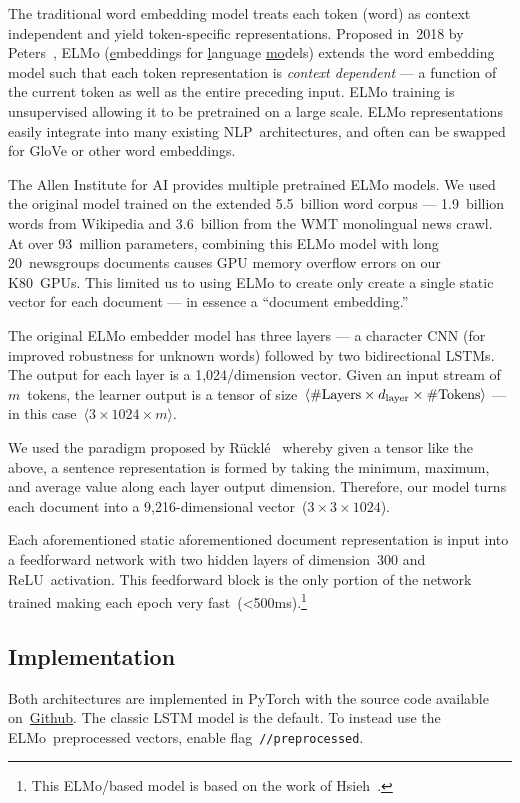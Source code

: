 The traditional word embedding model treats each token (word) as context independent and yield token-specific representations. Proposed in~2018 by Peters\etal~\cite{Peters:2018}, ELMo (\underline{e}mbeddings for \underline{l}anguage \underline{mo}dels) extends the word embedding model such that each token representation is \textit{context dependent} --- a function of the current token as well as the entire preceding input.  ELMo training is unsupervised allowing it to be pretrained on a large scale.  ELMo representations easily integrate into many existing NLP~architectures, and often can be swapped for GloVe or other word embeddings.

The Allen Institute for AI provides multiple pretrained ELMo models.  We used the original model trained on the extended 5.5~billion word corpus --- 1.9~billion words from Wikipedia and 3.6~billion from the WMT monolingual news crawl. At over 93~million parameters, combining this ELMo model with long 20~newsgroups documents causes GPU memory overflow errors on our K80~GPUs.  This limited us to using ELMo to create only create a single static vector for each document --- in essence a ``document embedding.''

The original ELMo embedder model has three layers --- a character CNN (for improved robustness for unknown words) followed by two bidirectional LSTMs.  The output for each layer is a 1,024\-/dimension vector.  Given an input stream of $m$~tokens, the learner output is a tensor of size~${\langle \textnormal{\#Layers} \times d_{\textnormal{layer}} \times \textnormal{\#Tokens} \rangle}$ --- in this case~${\langle 3 \times 1024 \times m \rangle}$.

We used the paradigm proposed by R\"{u}ckl\'{e}\etal~\cite{Ruckle:2018} whereby given a tensor like the above, a sentence representation is formed by taking the minimum, maximum, and average value along each layer output dimension. Therefore, our model turns each document into a 9,216-dimensional vector~(${3\times3\times1024}$).

Each aforementioned static aforementioned document representation is input into a feedforward network with two hidden layers of dimension~300 and ReLU~activation.  This feedforward block is the only portion of the network trained making each epoch very fast~(<500ms).\footnote{This ELMo\-/based model is based on the work of Hsieh\etal~\cite{Hsieh:2018}.}

\subsection{Implementation}

Both architectures are implemented in PyTorch with the source code available on~\href{\sourceCode}{Github}.  The classic LSTM model is the default. To instead use the ELMo~preprocessed vectors, enable flag~\texttt{\-/\-/preprocessed}.
